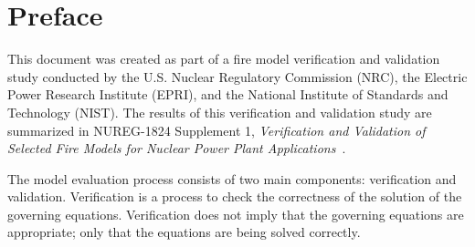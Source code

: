 \documentclass[11pt]{book}
\begin{document}
\newpage

\begin{minipage}[t][9in][s]{6.25in}


\vspace{3in}

\large
{}

\vfill

\hspace{1in}

\end{minipage}

\clearpage

\frontmatter

\pagestyle{plain}

\chapter{Preface}

This document was created as part of a fire model verification and validation study conducted by the U.S. Nuclear Regulatory Commission (NRC), the Electric Power Research Institute (EPRI), and the National Institute of Standards and Technology (NIST). The results of this verification and validation study are summarized in NUREG-1824 Supplement 1, {\em Verification and Validation of Selected Fire Models for Nuclear Power Plant Applications}~\cite{NUREG_1824_Sup_1}.

The model evaluation process consists of two main components: verification and validation. Verification is a process to check the correctness of the solution of the governing equations. Verification does not imply that the governing equations are appropriate; only that the equations are being solved correctly.
\end{document}
